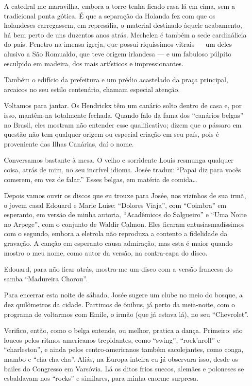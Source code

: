 A catedral me maravilha, embora a torre tenha ficado rasa lá em cima, sem a tradicional ponta gótica. É que a separação da Holanda fez com que os holandeses carregassem, em represália, o material destinado àquele acabamento, há bem perto de uns duzentos anos atrás. Mechelen é também a sede cardinálicia do país. Penetro na imensa igreja, que possui riquíssimos vitrais --- um deles alusivo a São Romualdo, que teve origem irlandesa --- e um fabuloso púlpito esculpido em madeira, dos mais artísticos e impressionantes.

Também o edifício da prefeitura e um prédio acastelado da praça principal, arcaicos no seu estilo centenário, chamam especial atenção.

Voltamos para jantar. Os Hendrickx têm um canário solto dentro de casa e, por isso, mantêm-na totalmente fechada. Quando falo da fama dos ``canários belgas'' no Brasil, eles mostram não entender esse qualificativo; dizem que o pássaro em questão não tem qualquer origem ou especial criação em seu país, pois é proveniente das Ilhas Canárias, daí o nome.

Conversamos bastante à mesa. O velho e sorridente Louis resmunga qualquer coisa, atrás de mim, no seu incrível idioma. Josée traduz: ``Papai diz para vocês comerem, em vez de falar.'' Esses belgas, em matéria de comida\ldots

Depois vamos ouvir os discos que eu trouxe para Josée, nos vizinhos de sua irmã, o jovem casal Edouard e Marie Luise: ``Dolores Viaja'', com ``Coimbra'' em esperanto, em versão de minha autoria, ``Acadêmicos do Salgueiro'' e ``Uma Noite no Arpege'', com o conjunto de Waldir Calmon. Eles ficaram entusiasmadíssimos com o segundo, embora a eletrola não reproduza a contento a fidelidade da gravação. A canção em esperanto causa admiração, mas esta é maior quando mostro o meu nome, como autor da versão, na contra-capa do disco.

Edouard, para não ficar atrás, mostra-me um disco com a versão francesa do samba ``Madureira Chorou''.

Para encerrar esta noite de sábado, Josée sugere um clube no meio do bosque, a dez quilômetros da cidade. Partimos de ônibus, já perto da meia-noite, com o programa de voltarmos com Emile, o irmão (que já estava lá), no seu ``Chevrolet''.

Verifico, então, como o belga entende, ou melhor, pratica a dança. Primeiro: são loucos pelos ritmos americanos trepidantes, como ``swing'', ``rock’nroll'' e ``charleston'', e ainda pelos centro-americanos também sacolejantes, como conga, mambo e ``cha-cha-cha''. Aliás, na Europa inteira eu já observara isso, desde os bailes do Congresso em Varsóvia. Lá os ditos frios suecos, alemães e poloneses se esbaldavam nos ``rocks'' e similares, para minha enorme surpresa.


